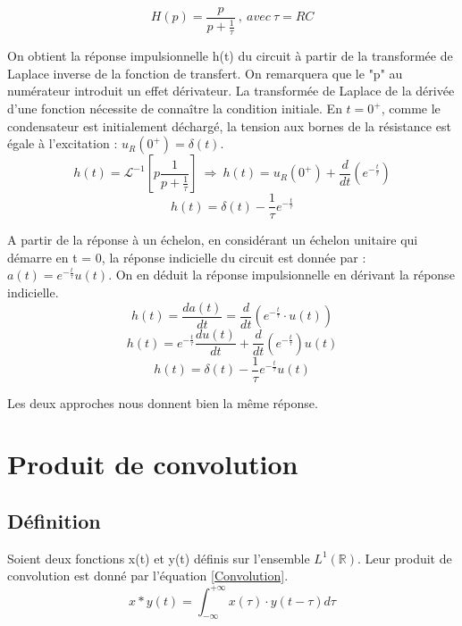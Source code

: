 	\begin{equation*}
	H(p)=\frac{p}{p+\frac{1}{\tau}}~,~avec~\tau=RC
	\end{equation*}
	
	On obtient la réponse impulsionnelle h(t) du circuit à partir de la transformée de Laplace inverse de la fonction de transfert. On remarquera que le "p" au numérateur introduit un effet dérivateur. La transformée de Laplace de la dérivée d'une fonction nécessite de connaître la condition initiale. En $t=0^{+}$, comme le condensateur est initialement déchargé, la tension aux bornes de la résistance est égale à l'excitation : $u_{R}(0^{+})=\delta(t)$. 
	\begin{equation*}
	h(t)= \mathcal{L}^{-1}[p\frac{1}{p+\frac{1}{\tau}}]~\Longrightarrow~h(t)=u_{R}(0^{+})+\frac{d}{dt}(e^{-\frac{t}{\tau}})
	\end{equation*}
	\begin{equation*}
	h(t)=\delta(t)-\frac{1}{\tau}e^{-\frac{t}{\tau}}
	\end{equation*}
	
	
	A partir de la réponse à un échelon, en considérant un échelon unitaire qui démarre en t = 0, la réponse indicielle du circuit est donnée par : $a(t)=e^{-\frac{t}{\tau}} u(t)$. On en déduit la réponse impulsionnelle en dérivant la réponse indicielle. 
	\begin{equation*}
	h(t)=\frac{da(t)}{dt}=\frac{d}{dt}(e^{-\frac{t}{\tau}}\cdot u(t))
	\end{equation*}
	\begin{equation*}
	h(t)=e^{-\frac{t}{\tau}}\frac{du(t)}{dt}+\frac{d}{dt}(e^{-\frac{t}{\tau}})u(t)
	\end{equation*}
	\begin{equation*}
	h(t)=\delta(t)-\frac{1}{\tau}e^{-\frac{t}{\tau}}u(t)
	\end{equation*}
	
		
	
	Les deux approches nous donnent bien la même réponse.
	
	
	\section{Produit de convolution}
	\subsection{Définition}
	Soient deux fonctions x(t) et y(t) définis sur l'ensemble $L^{1}(\mathbb{R})$. Leur produit de convolution est donné par l'équation \ref{Convolution}.
	\begin{equation}\label{Convolution}
	x*y(t) = \int_{-\infty}^{+ \infty} x(\tau) \cdot y(t-\tau)d\tau 
	\end{equation}
	

